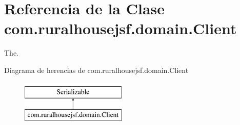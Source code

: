 \hypertarget{classcom_1_1ruralhousejsf_1_1domain_1_1_client}{}\section{Referencia de la Clase com.\+ruralhousejsf.\+domain.\+Client}
\label{classcom_1_1ruralhousejsf_1_1domain_1_1_client}


The.  


Diagrama de herencias de com.\+ruralhousejsf.\+domain.\+Client\begin{figure}[H]
\begin{center}
\leavevmode
\includegraphics[height=2.000000cm]{de/de3/classcom_1_1ruralhousejsf_1_1domain_1_1_client}
\end{center}
\end{figure}
